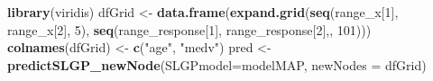 \documentclass[
]{article}
\newenvironment{Shaded}{\begin{snugshade}}{\end{snugshade}}
\newcommand{\AttributeTok}[1]{\textcolor[rgb]{0.13,0.29,0.53}{#1}}
\newcommand{\DecValTok}[1]{\textcolor[rgb]{0.00,0.00,0.81}{#1}}
\newcommand{\FunctionTok}[1]{\textcolor[rgb]{0.13,0.29,0.53}{\textbf{#1}}}
\newcommand{\NormalTok}[1]{#1}
\newcommand{\OtherTok}[1]{\textcolor[rgb]{0.56,0.35,0.01}{#1}}
\newcommand{\StringTok}[1]{\textcolor[rgb]{0.31,0.60,0.02}{#1}}
\begin{document}
\begin{Shaded}
\begin{Highlighting}[]

\FunctionTok{library}\NormalTok{(viridis)}
\NormalTok{dfGrid }\OtherTok{\textless{}{-}} \FunctionTok{data.frame}\NormalTok{(}\FunctionTok{expand.grid}\NormalTok{(}\FunctionTok{seq}\NormalTok{(range\_x[}\DecValTok{1}\NormalTok{], range\_x[}\DecValTok{2}\NormalTok{], }\DecValTok{5}\NormalTok{), }
                                 \FunctionTok{seq}\NormalTok{(range\_response[}\DecValTok{1}\NormalTok{], range\_response[}\DecValTok{2}\NormalTok{],, }\DecValTok{101}\NormalTok{)))}
\FunctionTok{colnames}\NormalTok{(dfGrid) }\OtherTok{\textless{}{-}} \FunctionTok{c}\NormalTok{(}\StringTok{"age"}\NormalTok{, }\StringTok{"medv"}\NormalTok{)}
\NormalTok{pred }\OtherTok{\textless{}{-}} \FunctionTok{predictSLGP\_newNode}\NormalTok{(}\AttributeTok{SLGPmodel=}\NormalTok{modelMAP,}
                            \AttributeTok{newNodes =}\NormalTok{ dfGrid)}


\end{Highlighting}
\end{Shaded}
\end{document}
